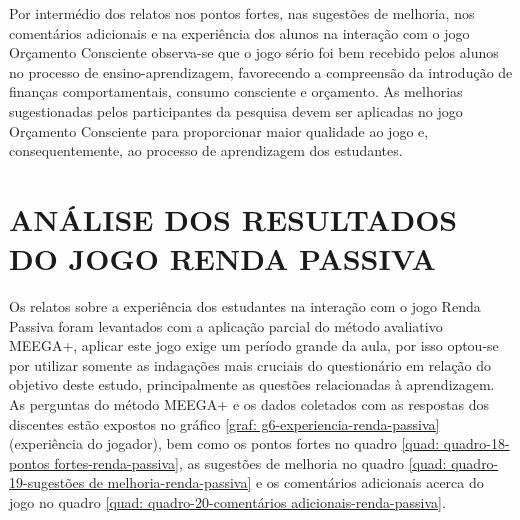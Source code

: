 \newpage
Por intermédio dos relatos nos pontos fortes, nas sugestões de melhoria, nos comentários adicionais e na experiência dos alunos na interação com o jogo Orçamento Consciente observa-se que o jogo sério foi bem recebido pelos alunos no processo de ensino-aprendizagem, favorecendo a compreensão da introdução de finanças comportamentais, consumo consciente e orçamento. As melhorias sugestionadas pelos participantes da pesquisa devem ser aplicadas no jogo Orçamento Consciente para proporcionar maior qualidade ao jogo e, consequentemente, ao processo de aprendizagem dos estudantes.

\section{ANÁLISE DOS RESULTADOS DO JOGO RENDA PASSIVA}
Os relatos sobre a experiência dos estudantes na interação com o jogo Renda Passiva foram levantados com a aplicação parcial do método avaliativo MEEGA+, aplicar este jogo exige um período grande da aula, por isso optou-se por utilizar somente as indagações mais cruciais do questionário em relação do objetivo deste estudo, principalmente as questões relacionadas à aprendizagem. As perguntas do método MEEGA+ e os dados coletados com as respostas dos discentes estão expostos no gráfico \ref{graf: g6-experiencia-renda-passiva} (experiência do jogador), bem como os pontos fortes no quadro \ref{quad: quadro-18-pontos fortes-renda-passiva}, as sugestões de melhoria no quadro \ref{quad: quadro-19-sugestões de melhoria-renda-passiva} e os comentários adicionais acerca do jogo no quadro \ref{quad: quadro-20-comentários adicionais-renda-passiva}.


